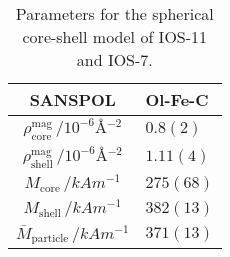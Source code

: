 \documentclass[\main/dresen_thesis.tex]{subfiles}
\begin{document}
    \begin{table}[!htbp]
      \centering
      \caption{\label{tab:colloidalCrystals:nanoparticle:sanspol}Parameters for the spherical core-shell model of IOS-11 and IOS-7.}
      \begin{tabular}{ c | l }
        \rule{0pt}{2ex} \textbf{SANSPOL}  & \textbf{Ol-Fe-C} \\
        \hline
        \rule{0pt}{2ex} $\rho^\mathrm{mag}_\mathrm{core} \, / \unit{10^{-6} \angstrom^{-2}}$  & $0.8(2)$ \\
        \rule{0pt}{2ex} $\rho^\mathrm{mag}_\mathrm{shell} \, / \unit{10^{-6} \angstrom^{-2}}$ & $1.11(4)$ \\
        \hline
        \rule{0pt}{2ex} $M_\mathrm{core} \, / \unit{kA m^{-1}}$       & $275(68)$ \\
        \rule{0pt}{2ex} $M_\mathrm{shell} \, / \unit{kA m^{-1}}$      & $382(13)$ \\
        \hline
        \rule{0pt}{2ex} $\bar{M}_\mathrm{particle} \, / \unit{kA m^{-1}}$ & $371(13)$ \\
        \hline
      \end{tabular}
    \end{table}
\end{document}
